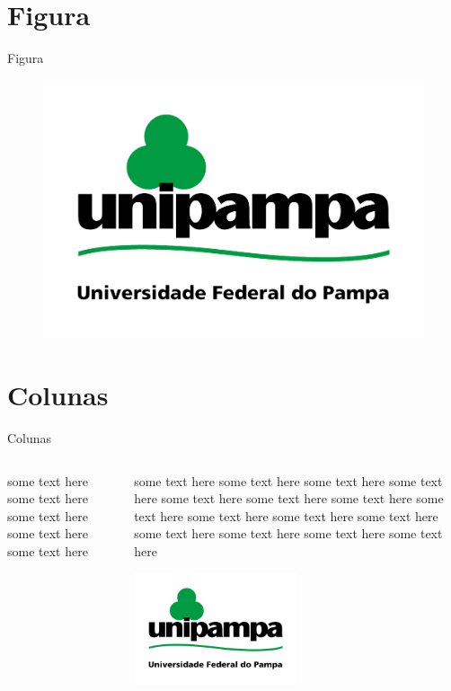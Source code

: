 \documentclass{beamer}
\begin{document}
\section{Figura}

\begin{frame}{Figura}

	\begin{figure}[!htb]
		\centering
		\includegraphics[scale=.45]{unipampa.png}
	\end{figure}

\end{frame}




\section{Colunas}
\begin{frame}{Colunas}

\begin{columns}
	\begin{column}{0.5\textwidth}
		some text here some text here some text here some text here some text here
	\end{column}
	\begin{column}{0.5\textwidth}  %
		some text here some text here some text here some text here some text here
		some text here some text here some text here some text here some text here
		some text here some text here some text here some text here some text here
		\begin{center}
			\includegraphics[width=0.5\textwidth]{unipampa.png}
		\end{center}
	\end{column}
\end{columns}

\end{frame}
\end{document}
